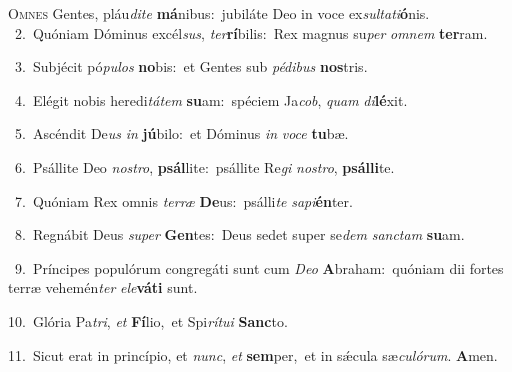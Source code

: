 \lettrine{\initial\textcolor{\initialcolor}{O}}{mnes} Gentes, pláu\-\textit{di}\-\textit{te} \textbf{má}\-nibus:~\star jubiláte Deo in voce ex\-\textit{sul}\-\textit{ta}\textit{ti}\textbf{ó}nis.\\
{\numbfont\textcolor{\numbcolor}{~2.}}~Quóniam Dóminus excél\-\textit{sus}\-, \textit{ter}\-\textbf{rí}bilis:~\star Rex magnus su\textit{per} \textit{om}\-\textit{nem} \textbf{ter}\-ram.\par
{\numbfont\textcolor{\numbcolor}{~3.}}~Subjécit pó\-\textit{pu}\-\textit{los} \textbf{no}\-bis:~\star et Gentes sub \textit{pé}\-\textit{di}\textit{bus} \textbf{nos}\-tris.\par
{\numbfont\textcolor{\numbcolor}{~4.}}~Elégit nobis heredi\-\textit{tá}\-\textit{tem} \textbf{su}\-am:~\star spéciem Ja\-\textit{cob}\-, \textit{quam} \textit{di}\-\textbf{lé}xit.\par
{\numbfont\textcolor{\numbcolor}{~5.}}~Ascéndit De\textit{us} \textit{in} \textbf{jú}\-bilo:~\star et Dóminus \textit{in} \textit{vo}\-\textit{ce} \textbf{tu}\-bæ.\par
{\numbfont\textcolor{\numbcolor}{~6.}}~Psállite Deo \textit{nos}\-\textit{tro}, \textbf{psál}\-lite:~\star psállite Re\textit{gi} \textit{nos}\-\textit{tro}, \textbf{psál}\-\textbf{li}te.\par
{\numbfont\textcolor{\numbcolor}{~7.}}~Quóniam Rex omnis \textit{ter}\-\textit{ræ} \textbf{De}\-us:~\star psálli\textit{te} \textit{sa}\-\textit{pi}\textbf{én}ter.\par
{\numbfont\textcolor{\numbcolor}{~8.}}~Regnábit Deus \textit{su}\-\textit{per} \textbf{Gen}\-tes:~\star Deus sedet super se\textit{dem} \textit{sanc}\-\textit{tam} \textbf{su}\-am.\par
{\numbfont\textcolor{\numbcolor}{~9.}}~Príncipes populórum congregáti sunt cum \textit{De}\-\textit{o} \textbf{A}\-braham:~\star quóniam dii fortes terræ vehemén\textit{ter} \textit{e}\-\textit{le}\textbf{vá}\textbf{ti} sunt.\par
{\numbfont\textcolor{\numbcolor}{10.}}~Glória Pa\-\textit{tri}\-, \textit{et} \textbf{Fí}\-lio,~\star et Spi\-\textit{rí}\-\textit{tu}\textit{i} \textbf{Sanc}\-to.\par
{\numbfont\textcolor{\numbcolor}{11.}}~Sicut erat in princípio, et \textit{nunc}\-, \textit{et} \textbf{sem}\-per,~\star et in sǽcula sæ\-\textit{cu}\-\textit{ló}\textit{rum}. \textbf{A}\-men.\par
